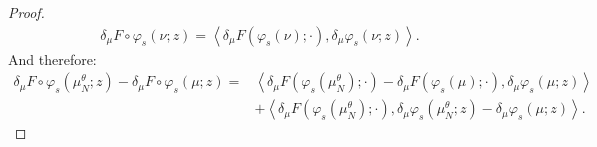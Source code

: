 \documentclass[11pt,a4paper]{article}
\newcommand{\brac}[1]{\left\langle#1\right\rangle}
\begin{document}
\begin{proof}
\begin{align*}
        \delta_\mu F\circ \varphi_s(\nu;z) = \brac{\delta_\mu F(\varphi_s(\nu);\cdot),\delta_\mu \varphi_s (\nu;z)}.
    \end{align*}
    And therefore:
    \begin{subequations}
    \begin{align}
        \delta_\mu F\circ \varphi_s\left(\mu^\theta_N;z\right) - \delta_\mu F\circ \varphi_s(\mu;z) =& \brac{\delta_\mu F\left(\varphi_s\left(\mu^\theta_N\right);\cdot\right) - \delta_\mu F(\varphi_s(\mu);\cdot),\delta_\mu \varphi_s (\mu;z)}\label{proof:eq:samesame-part1} \\
         &+ \brac{\delta_\mu F\left(\varphi_s\left(\mu^\theta_N\right);\cdot\right),\delta_\mu \varphi_s \left(\mu^\theta_N;z\right) - \delta_\mu \varphi_s (\mu;z)}\label{proof:eq:samesame-part2} .
    \end{align}
    \end{subequations}


\end{proof}
\end{document}
